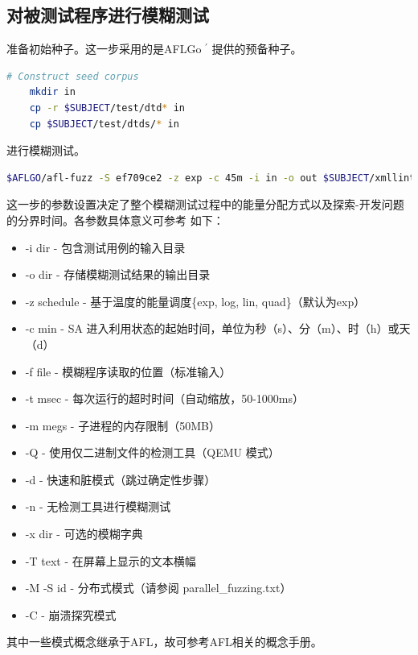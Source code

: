 \documentclass[bachelor]{njupthesis}
\begin{document}
\subsection{对被测试程序进行模糊测试}
准备初始种子。这一步采用的是AFLGo $^\prime$ 提供的预备种子。
\begin{lstlisting}[language=bash]
	# Construct seed corpus
	mkdir in
	cp -r $SUBJECT/test/dtd* in
	cp $SUBJECT/test/dtds/* in
\end{lstlisting}

进行模糊测试。
\begin{lstlisting}[language=bash]
$AFLGO/afl-fuzz -S ef709ce2 -z exp -c 45m -i in -o out $SUBJECT/xmllint --valid --recover @@
\end{lstlisting}

这一步的参数设置决定了整个模糊测试过程中的能量分配方式以及探索-开发问题的分界时间。各参数具体意义可参考
如下：
\begin{itemize}[leftmargin=36pt]
	\item -i dir        - 包含测试用例的输入目录
	\item -o dir        - 存储模糊测试结果的输出目录
	\item -z schedule   - 基于温度的能量调度\{exp, log, lin, quad\}（默认为exp）
	\item -c min        - SA 进入利用状态的起始时间，单位为秒（s）、分（m）、时（h）或天（d）
	\item -f file       - 模糊程序读取的位置（标准输入）
	\item -t msec       - 每次运行的超时时间（自动缩放，50-1000ms）
	\item -m megs       - 子进程的内存限制（50MB）
	\item -Q            - 使用仅二进制文件的检测工具（QEMU 模式）
	\item -d            - 快速和脏模式（跳过确定性步骤）
	\item -n            - 无检测工具进行模糊测试
	\item -x dir        - 可选的模糊字典
	\item -T text       - 在屏幕上显示的文本横幅
	\item -M \/ -S id    - 分布式模式（请参阅 parallel\_fuzzing.txt）
	\item -C            - 崩溃探究模式
\end{itemize}

其中一些模式概念继承于AFL，故可参考AFL相关的概念手册。
\end{document}
